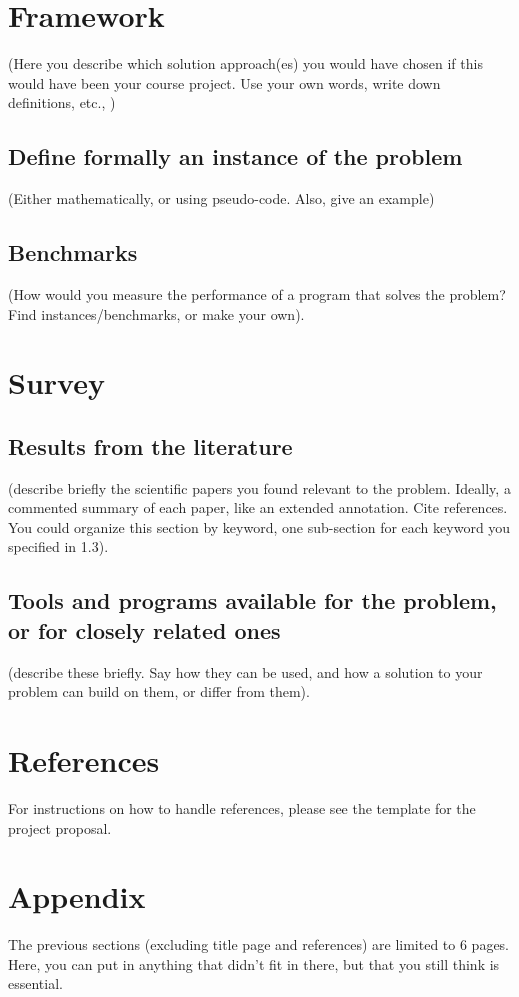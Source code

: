 \documentclass[a4paper,11pt]{article}
\begin{document}
\section{Framework}
(Here you describe which solution approach(es) you would have chosen if
this would have been your course project. Use your own words, write down
definitions, etc., )
\subsection{Define formally an instance of the problem}
(Either mathematically, or using pseudo-code. Also, give an example)
\subsection{Benchmarks}
(How would you measure the performance of a program that solves the problem?
Find instances/benchmarks, or make your own).

\section{Survey}
\subsection{Results from the literature}
(describe briefly the scientific papers you found relevant to the problem.  Ideally, a commented summary of each paper, like an extended annotation.  Cite references. You could organize this section by keyword, one sub-section for each keyword you specified in 1.3).

\subsection{Tools and programs available for the problem, or for closely related ones}
(describe these briefly. Say how they can be used, and how a solution to your problem can build on them, or differ from them).

\section{References}

For instructions on how to handle references, please see the template for
the project proposal.


\section{Appendix}
The previous sections (excluding title page and references) are limited to 6 pages. Here, you can put in anything that didn't fit in there, but that you still think is essential.
\end{document}

